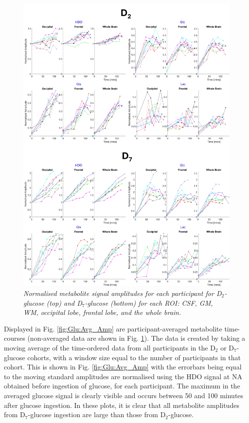 \begin{figure}
    \centering
    \includegraphics[width = 1\textwidth]{Figures/Glucose/Ind_Amp.png}
    \caption{\textit{Normalised metabolite signal amplitudes for each participant for D$_2$-glucose (top) and D$_7$-glucose (bottom) for each \ac{ROI}: \ac{CSF}, \ac{GM}, \ac{WM}, occipital lobe, frontal lobe, and the whole brain.}}
    \label{fig:Glu:Ind_Amp}
\end{figure}

Displayed in Fig. \ref{fig:Glu:Avg_Amp} are participant-averaged metabolite time-courses (non-averaged data are shown in Fig. \ref{fig:Glu:Ind_Amp}). The data is created by taking a moving average of the time-ordered data from all participants in the D$_2$ or D$_7$-glucose cohorts, with a window size equal to the number of participants in that cohort. This is shown in Fig. \ref{fig:Glu:Avg_Amp} with the errorbars being equal to the moving standard  amplitudes are normalised using the \ac{HDO} signal at \ac{NA} obtained before ingestion of glucose, for each participant. The maximum in the averaged glucose signal is clearly visible and occurs between 50 and 100 minutes after glucose ingestion. In these plots, it is clear that all metabolite amplitudes from D$_7$-glucose ingestion are large than those from D$_2$-glucose. 

